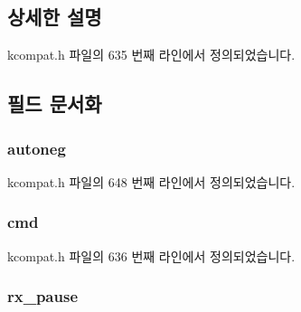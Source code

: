 \subsection{상세한 설명}


kcompat.\+h 파일의 635 번째 라인에서 정의되었습니다.



\subsection{필드 문서화}
\subsubsection[{\texorpdfstring{autoneg}{autoneg}}]{ autoneg}\hypertarget{struct__kc__ethtool__pauseparam_a4d6e97740e642fae7af06f3f19643305}{}\label{struct__kc__ethtool__pauseparam_a4d6e97740e642fae7af06f3f19643305}


kcompat.\+h 파일의 648 번째 라인에서 정의되었습니다.

\subsubsection[{\texorpdfstring{cmd}{cmd}}]{ cmd}\hypertarget{struct__kc__ethtool__pauseparam_a62fe2a1dbf17d5a8561a5a7f5a97a9ba}{}\label{struct__kc__ethtool__pauseparam_a62fe2a1dbf17d5a8561a5a7f5a97a9ba}


kcompat.\+h 파일의 636 번째 라인에서 정의되었습니다.

\subsubsection[{\texorpdfstring{rx\+\_\+pause}{rx_pause}}]{ rx\+\_\+pause}\hypertarget{struct__kc__ethtool__pauseparam_a9aa8c27f7cd9d39e92d19d0927e9a1df}{}\label{struct__kc__ethtool__pauseparam_a9aa8c27f7cd9d39e92d19d0927e9a1df}


